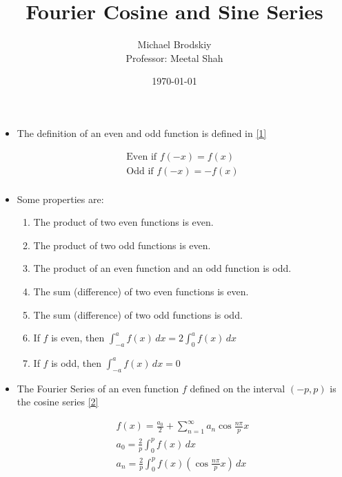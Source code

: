 \documentclass[12pt]{article}
\title{Fourier Cosine and Sine Series}
\date{\today}
\author{Michael Brodskiy\\ \small Professor: Meetal Shah}
\begin{document}
\maketitle

\begin{itemize}

  \item The definition of an even and odd function is defined in \eqref{1}

    \begin{equation}
      \begin{split}
      \text{Even if } f(-x)=f(x)\\
      \text{Odd if } f(-x)=-f(x)\\
    \end{split}
      \label{1}
    \end{equation}

  \item Some properties are:

    \begin{enumerate}

      \item The product of two even functions is even.

      \item The product of two odd functions is even.

      \item The product of an even function and an odd function is odd.

      \item The sum (difference) of two even functions is even.

      \item The sum (difference) of two odd functions is odd.

      \item If $f$ is even, then $\int_{-a}^a f(x)\,dx=2\int_0^a f(x)\,dx$

      \item If $f$ is odd, then $\int_{-a}^a f(x)\,dx=0$

    \end{enumerate}

  \item The Fourier Series of an even function $f$ defined on the interval $(-p,p)$ is the cosine series \eqref{2}

    \begin{equation}
      \begin{split}
        f(x)=\frac{a_0}{2}+\sum_{n=1}^{\infty} a_n\cos\frac{n\pi}{p}x\\
        a_0=\frac{2}{p}\int_0^pf(x)\,dx\\
      a_n=\frac{2}{p}\int_0^pf(x)\left(\cos\frac{n\pi}{p}x\right)\,dx\\
      \end{split}
      \label{2}
    \end{equation}


\end{itemize}
\end{document}

